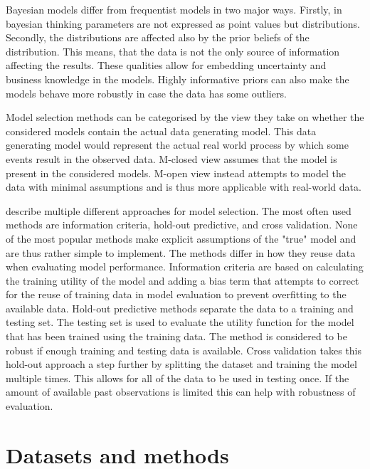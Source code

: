 \documentclass[english, 12pt, a4paper, sci, utf8, a-1b, online]{aaltothesis}
\begin{document}
Bayesian models differ from frequentist models in two major ways. Firstly, in bayesian thinking parameters are not expressed as point values but distributions. Secondly, the distributions are affected also by the prior beliefs of the distribution. This means, that the data is not the only source of information affecting the results. These qualities allow for embedding uncertainty and business knowledge in the models. Highly informative priors can also make the models behave more robustly in case the data has some outliers. 

Model selection methods can be categorised by the view they take on whether the considered models contain the actual data generating model. This data generating model would represent the actual real world process by which some events result in the observed data. M-closed view assumes that the model is present in the considered models. M-open view instead attempts to model the data with minimal assumptions and is thus more applicable with real-world data. 

\cite{vehtari2012} describe multiple different approaches for model selection. The most often used methods are information criteria, hold-out predictive, and cross validation. None of the most popular methods make explicit assumptions of the "true" model and are thus rather simple to implement. The methods differ in how they reuse data when evaluating model performance. Information criteria are based on calculating the training utility of the model and adding a bias term that attempts to correct for the reuse of training data in model evaluation to prevent overfitting to the available data. Hold-out predictive methods separate the data to a training and testing set. The testing set is used to evaluate the utility function for the model that has been trained using the training data. The method is considered to be robust if enough training and testing data is available. Cross validation takes this hold-out approach a step further by splitting the dataset and training the model multiple times. This allows for all of the data to be used in testing once. If the amount of available past observations is limited this can help with robustness of evaluation.


\section{Datasets and methods}
\end{document}
